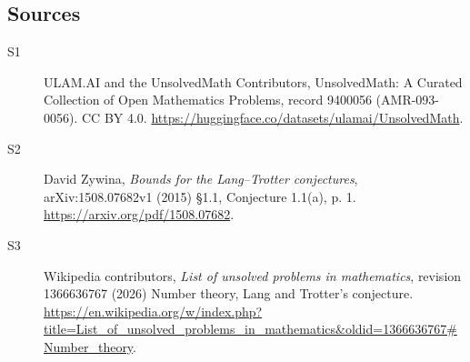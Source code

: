 \documentclass[11pt]{article}
\begin{document}
\subsection{Sources}
\begin{description}
\item[\hypertarget{source:9400056:1}{S1}] ULAM.AI and the UnsolvedMath Contributors, UnsolvedMath: A Curated Collection of Open Mathematics Problems, record 9400056 (AMR-093-0056). CC BY 4.0. \url{https://huggingface.co/datasets/ulamai/UnsolvedMath}.
\item[\hypertarget{source:9400056:2}{S2}] David Zywina, \emph{Bounds for the Lang--Trotter conjectures}, arXiv:1508.07682v1 (2015) \S1.1, Conjecture 1.1(a), p. 1. \url{https://arxiv.org/pdf/1508.07682}.
\item[\hypertarget{source:9400056:3}{S3}] Wikipedia contributors, \emph{List of unsolved problems in mathematics}, revision 1366636767 (2026) Number theory, Lang and Trotter's conjecture. \url{https://en.wikipedia.org/w/index.php?title=List_of_unsolved_problems_in_mathematics&oldid=1366636767#Number_theory}.
\end{description}
\label{end:9400056}
\end{document}
